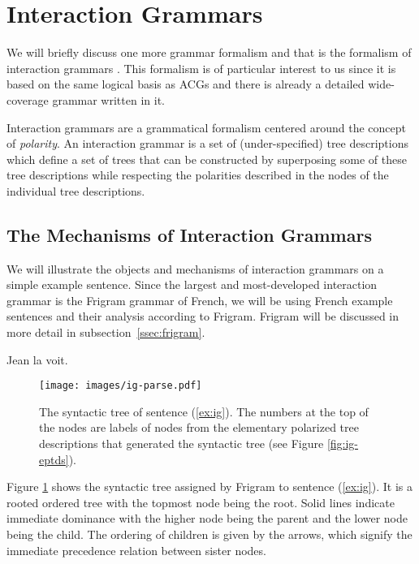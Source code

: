 \section{Interaction Grammars}

We will briefly discuss one more grammar formalism and that is the
formalism of interaction grammars \cite{guillaume2009interaction}. This
formalism is of particular interest to us since it is based on the same
logical basis as ACGs and there is already a detailed wide-coverage
grammar written in it.

Interaction grammars are a grammatical formalism centered around the
concept of \emph{polarity}. An interaction grammar is a set of
(under-specified) tree descriptions which define a set of trees that can
be constructed by superposing some of these tree descriptions while
respecting the polarities described in the nodes of the individual tree
descriptions.

\subsection{The Mechanisms of Interaction Grammars}

We will illustrate the objects and mechanisms of interaction grammars on
a simple example sentence. Since the largest and most-developed
interaction grammar is the Frigram grammar of French, we will be using
French example sentences and their analysis according to
Frigram. Frigram will be discussed in more detail in
subsection~\ref{ssec:frigram}.

\begin{exe}
  \ex \label{ex:ig} Jean la voit.
\end{exe}

\begin{figure}
  \centering
  \texttt{[image: images/ig-parse.pdf]}
  \caption{\label{fig:ig-parse} The syntactic tree of sentence
    (\ref{ex:ig}). The numbers at the top of the nodes are labels of
    nodes from the elementary polarized tree descriptions that generated
    the syntactic tree (see Figure \ref{fig:ig-eptds}).}
\end{figure}

Figure \ref{fig:ig-parse} shows the syntactic tree assigned by Frigram
to sentence (\ref{ex:ig}). It is a rooted ordered tree with the topmost
node being the root. Solid lines indicate immediate dominance with the
higher node being the parent and the lower node being the child. The
ordering of children is given by the arrows, which signify the immediate
precedence relation between sister nodes.

